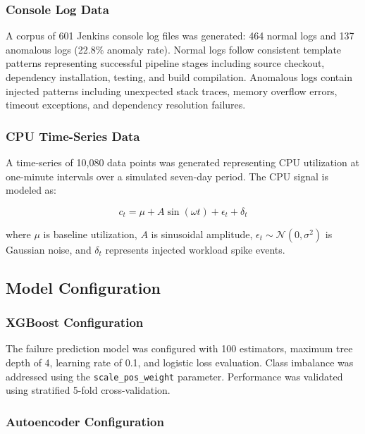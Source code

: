 \documentclass[conference]{IEEEtran}
\begin{document}
\subsubsection{Console Log Data}

A corpus of 601 Jenkins console log files was generated: 464 normal logs and 137 anomalous logs (22.8\% anomaly rate). Normal logs follow consistent template patterns representing successful pipeline stages including source checkout, dependency installation, testing, and build compilation. Anomalous logs contain injected patterns including unexpected stack traces, memory overflow errors, timeout exceptions, and dependency resolution failures.

\subsubsection{CPU Time-Series Data}

A time-series of 10,080 data points was generated representing CPU utilization at one-minute intervals over a simulated seven-day period. The CPU signal is modeled as:

\begin{equation}
c_t = \mu + A \sin(\omega t) + \epsilon_t + \delta_t
\end{equation}

where $\mu$ is baseline utilization, $A$ is sinusoidal amplitude, $\epsilon_t \sim \mathcal{N}(0, \sigma^2)$ is Gaussian noise, and $\delta_t$ represents injected workload spike events.

\subsection{Model Configuration}

\subsubsection{XGBoost Configuration}

The failure prediction model was configured with 100 estimators, maximum tree depth of 4, learning rate of 0.1, and logistic loss evaluation. Class imbalance was addressed using the \texttt{scale\_pos\_weight} parameter. Performance was validated using stratified 5-fold cross-validation.

\subsubsection{Autoencoder Configuration}
\end{document}
